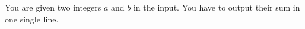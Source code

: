 You are given two integers $a$ and $b$ in the input. 
You have to output their sum in one single line.